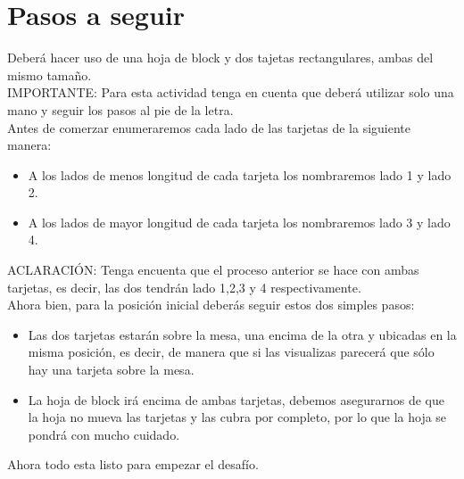 \documentclass{article}
\begin{document}
\section{Pasos a seguir} \label{contenido}
Deberá hacer uso de una hoja de block y dos tajetas rectangulares, ambas del mismo tamaño.\\ 
IMPORTANTE: Para esta actividad tenga en cuenta que deberá utilizar solo una mano y seguir los pasos al pie de la letra. \\
Antes de comerzar enumeraremos cada lado de las tarjetas de la siguiente manera:
\begin{itemize}
    \item A los lados de menos longitud de cada tarjeta los nombraremos lado 1 y lado 2.
    \item A los lados de mayor longitud de cada tarjeta los nombraremos lado 3 y lado 4.
\end{itemize}
    ACLARACIÓN: Tenga encuenta que el proceso anterior se hace con ambas tarjetas, es decir, las dos tendrán lado 1,2,3 y 4 respectivamente.\\
Ahora bien, para la posición inicial deberás seguir estos dos simples pasos:
\begin{itemize}
    \item Las dos tarjetas estarán sobre la mesa, una encima de la otra y ubicadas en la misma posición, es decir, de manera que si las visualizas parecerá que sólo hay una tarjeta sobre la mesa. 
    \item La hoja de block irá encima de ambas tarjetas, debemos asegurarnos de que la hoja no mueva las tarjetas y las cubra por completo, por lo que la hoja se pondrá con mucho cuidado.
\end{itemize}
Ahora todo esta listo para empezar el desafío.
\end{document}
